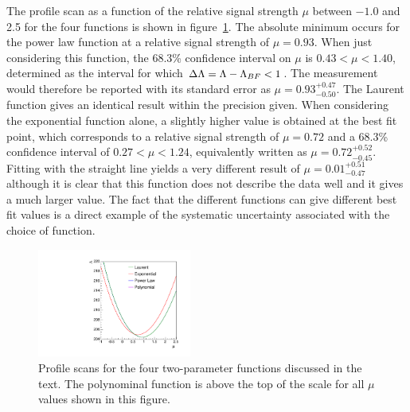 The profile scan as a function of the relative signal strength $\mu$
between $-1.0$ and 2.5
for the four functions is shown in
figure~\ref{fig:functions:profiles}.
The absolute minimum occurs for the power law function at a relative signal
strength of $\mu = 0.93$. When just considering this function,
the 68.3\% confidence interval on $\mu$ is
$0.43 < \mu < 1.40 $, determined as the interval for which $\Delta{\rm \ensuremath{\Lambda}} = \Lambda - \Lambda_{BF} < 1$.
The measurement would therefore be reported with its standard error as $\mu=0.93^{+0.47}_{-0.50}$. The Laurent function gives an identical result within the precision given.
When considering the exponential function alone, a slightly higher
\nll value is obtained
at the best fit point, which corresponds to a relative signal strength of $\mu = 0.72$
and a 68.3\% confidence interval of
$0.27 < \mu < 1.24 $, equivalently written as $\mu = 0.72^{+0.52}_{-0.45}$.
Fitting with the straight line yields a very different result of
$\mu = 0.01^{+0.51}_{-0.47}$
although it is clear that this function does not describe the data well and it
gives a much larger \nll value.
The fact that the different functions can give different best fit values
is a direct example of the systematic uncertainty associated
with the choice of function.
%
\begin{figure}[tbp]
\centering
\includegraphics[width=0.45\textwidth]{functions/Profiles.pdf}
\caption{Profile \nll scans for the four two-parameter
functions discussed in the text.
The polynominal function is above the top of the \nll scale for all
$\mu$ values shown in this figure. }
\label{fig:functions:profiles}
\end{figure}

